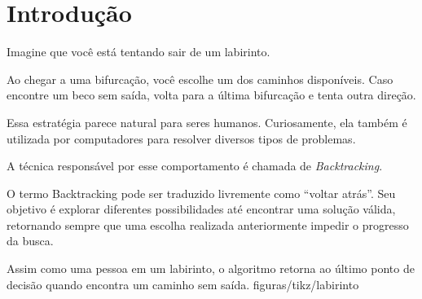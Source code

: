 \section{Introdução}

Imagine que você está tentando sair de um labirinto.

Ao chegar a uma bifurcação, você escolhe um dos caminhos disponíveis. Caso encontre um beco sem saída, volta para a última bifurcação e tenta outra direção.

Essa estratégia parece natural para seres humanos. Curiosamente, ela também é utilizada por computadores para resolver diversos tipos de problemas.

A técnica responsável por esse comportamento é chamada de \emph{Backtracking}.

\begin{ideiachave}
O termo Backtracking pode ser traduzido livremente como ``voltar atrás''. Seu objetivo é explorar diferentes possibilidades até encontrar uma solução válida, retornando sempre que uma escolha realizada anteriormente impedir o progresso da busca.
\end{ideiachave}

%
  {Assim como uma pessoa em um labirinto, o algoritmo retorna ao último ponto de decisão quando encontra um caminho sem saída.}%
  {figuras/tikz/labirinto}
